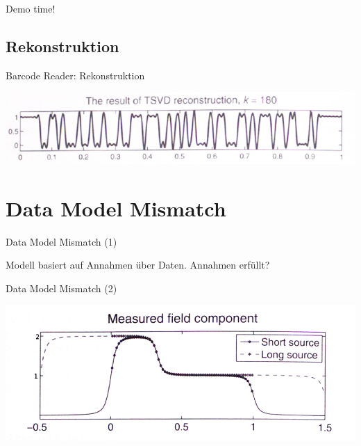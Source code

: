 \documentclass[11pt]{beamer}
\begin{document}
\begin{frame}
\begin{center}
Demo time!
\end{center}
\end{frame}


\subsection{Rekonstruktion}
\begin{frame}{Barcode Reader: Rekonstruktion}
\begin{center}
\includegraphics[scale=0.5]{Barcode_TSVD.PNG} 
\end{center}
\end{frame}


\section{Data Model Mismatch}
\begin{frame}{Data Model Mismatch (1)}

Modell basiert auf Annahmen über Daten. Annahmen erfüllt?

\end{frame}



\begin{frame}{Data Model Mismatch (2)}

\begin{center}

\includegraphics[scale=0.4]{DataModel_graph.PNG} 

\end{center}

\end{frame}
\end{document}
